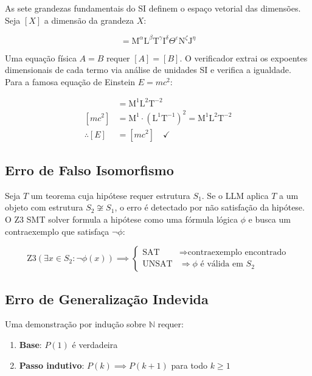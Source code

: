 \documentclass[5p]{elsarticle}
\theoremstyle{remark}
\begin{document}
As sete grandezas fundamentais do SI definem o espaço vetorial das dimensões. Seja $[X]$ a dimensão da grandeza $X$:

\begin{equation}
[X] = \text{M}^\alpha \text{L}^\beta \text{T}^\gamma \text{I}^\delta \Theta^\varepsilon \text{N}^\zeta \text{J}^\eta
\label{eq:dimension}
\end{equation}

Uma equação física $A = B$ requer $[A] = [B]$. O verificador extrai os expoentes dimensionais de cada termo via análise de unidades SI e verifica a igualdade. Para a famosa equação de Einstein $E = mc^2$:

\begin{align}
[E] &= \text{M}^1 \text{L}^2 \text{T}^{-2} \\
[mc^2] &= \text{M}^1 \cdot (\text{L}^1 \text{T}^{-1})^2 = \text{M}^1 \text{L}^2 \text{T}^{-2} \\
\therefore [E] &= [mc^2] \quad \checkmark
\end{align}

\subsection{Erro de Falso Isomorfismo}

Seja $T$ um teorema cuja hipótese requer estrutura $S_1$. Se o LLM aplica $T$ a um objeto com estrutura $S_2 \not\cong S_1$, o erro é detectado por não satisfação da hipótese. O Z3 SMT solver formula a hipótese como uma fórmula lógica $\phi$ e busca um contraexemplo que satisfaça $\neg\phi$:

\begin{equation}
\text{Z3}(\exists x \in S_2: \neg\phi(x)) \implies \begin{cases}
\text{SAT} & \Rightarrow \text{contraexemplo encontrado} \\
\text{UNSAT} & \Rightarrow \phi \text{ é válida em } S_2
\end{cases}
\label{eq:z3}
\end{equation}

\subsection{Erro de Generalização Indevida}

Uma demonstração por indução sobre $\mathbb{N}$ requer:

\begin{enumerate}
    \item \textbf{Base}: $P(1)$ é verdadeira
    \item \textbf{Passo indutivo}: $P(k) \implies P(k+1)$ para todo $k \geq 1$
\end{enumerate}
\end{document}
